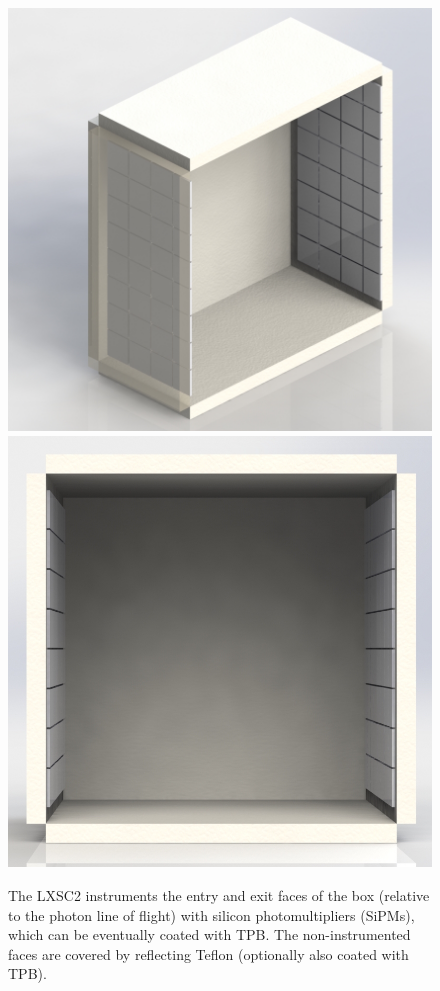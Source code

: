 \begin{figure}[!htbp]
	\centering
	\includegraphics[scale=0.20]{img/Box_2faces_1.jpg}
	\includegraphics[scale=0.20]{img/Box_2faces_3.jpg}
	\caption{The LXSC2 instruments the entry and exit faces of the box (relative to the photon line of flight) with silicon photomultipliers (SiPMs), which can be eventually coated with TPB. The non-instrumented faces are covered by reflecting Teflon (optionally also coated with TPB).}\label{fig.box} 
\end{figure}
